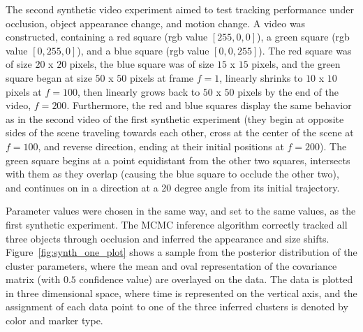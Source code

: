\documentclass[smallcondensed, final]{svjour3}
\newcommand{\willie}[1]{\textcolor{green}{\textsf{\emph{\textbf{\textcolor{green}{#1}}}}}}
\begin{document}

The second synthetic video experiment aimed to test tracking performance under occlusion, object appearance change, and motion change. A video was constructed, containing a red square (rgb value $[255,0,0]$), a green square (rgb value $[0,255,0]$), and a blue square (rgb value $[0,0,255]$). The red square was of size $20$ x $20$ pixels, the blue square was of size $15$ x $15$ pixels, and the green square began at size $50$ x $50$ pixels at frame $f=1$, linearly shrinks to $10$ x $10$ pixels at $f=100$, then linearly grows back to $50$ x $50$ pixels by the end of the video, $f=200$. Furthermore, the red and blue squares display the same behavior as in the second video of the first synthetic experiment (they begin at opposite sides of the scene traveling towards each other, cross at the center of the scene at $f=100$, and reverse direction, ending at their initial positions at $f=200$). The green square begins at a point equidistant from the other two squares, intersects with them as they overlap (causing the blue square to occlude the other two), and continues on in a direction at a 20 degree angle from its initial trajectory.

Parameter values were chosen in the same way, and set to the same values, as the first synthetic experiment. The MCMC inference algorithm correctly tracked all three objects through occlusion and inferred the appearance and size shifts. Figure~\ref{fig:synth_one_plot} shows a sample from the posterior distribution of the cluster parameters, where the mean and oval representation of the covariance matrix (with $0.5$ confidence value) are overlayed on the data. The data is plotted in three dimensional space, where time is represented on the vertical axis, and the assignment of each data point to one of the three inferred clusters is denoted by color and marker type. 


\end{document}
